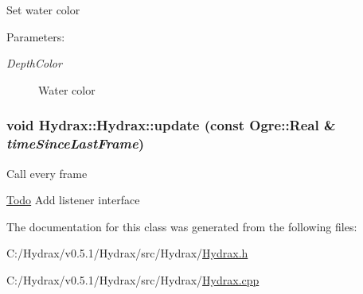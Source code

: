 Set water color \begin{Desc}
\item[Parameters:]
\begin{description}
\item[{\em DepthColor}]Water color \end{description}
\end{Desc}
\hypertarget{class_hydrax_1_1_hydrax_c584e30a6cbfb5d8884afb182c29d36a}{
\subsubsection[{update}]{\setlength{\rightskip}{0pt plus 5cm}void Hydrax::Hydrax::update (const Ogre::Real \& {\em timeSinceLastFrame})}}
\label{class_hydrax_1_1_hydrax_c584e30a6cbfb5d8884afb182c29d36a}


Call every frame \begin{Desc}
\item[\hyperlink{todo__todo000001}{Todo}]Add listener interface \end{Desc}


The documentation for this class was generated from the following files:\begin{CompactItemize}
\item 
C:/Hydrax/v0.5.1/Hydrax/src/Hydrax/\hyperlink{_hydrax_8h}{Hydrax.h}\item 
C:/Hydrax/v0.5.1/Hydrax/src/Hydrax/\hyperlink{_hydrax_8cpp}{Hydrax.cpp}\end{CompactItemize}
